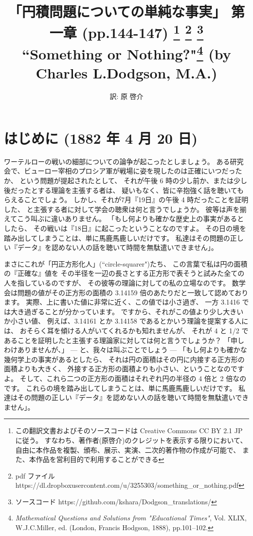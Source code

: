 \documentclass{article}
\title{「円積問題についての単純な事実」 第一章 (pp.144-147)
    \footnote{この翻訳文書およびそのソースコードは
    Creative Commons CC BY 2.1 JP に従う。
    すなわち、著作者(原啓介)のクレジットを表示する限りにおいて、
    自由に本作品を複製、頒布、展示、実演、二次的著作物の作成が可能で、
    また、本作品を営利目的で利用することができる}
    \footnote{pdf ファイル https://dl.dropboxusercontent.com/u/3255303/something\_or\_nothing.pdf}
    \footnote{ソースコード https://github.com/kshara/Dodgson\_translations/}
    \\
    \smallskip
    {\large
        ``Something or Nothing?"\footnote{
          {\it Mathematical Questions and Solutions from "Educational Times"},
            Vol. XLIX,
          W.J.C.Miller, ed. (London, Francis Hodgson, 1888), pp.101--102.}
    (by Charles L.Dodgson, M.A.)
    }
}
\author{訳: 原 啓介}
\begin{document}
\maketitle


\section{はじめに (1882 年 4 月 20 日)}

 ワーテルローの戦いの細部についての論争が起こったとしましょう。
ある研究会で、ビューロー宰相のプロシア軍が戦場に姿を現したのは正確にいつだったか、
という問題が提起されたとして、
それが午後 6 時の少し前か、または少し後だったとする理論を主張する者は、
疑いもなく、皆に辛抱強く話を聴いてもらえることでしょう。
しかし、それが7月『19日』の午後 4 時だったことを証明した、
と主張する者に対して学会の聴衆は何と言うでしょうか。
彼等は声を揃えてこう叫ぶに違いありません。
「もし何よりも確かな歴史上の事実があるとしたら、
その戦いは『18日』に起こったということなのですよ。
その日の境を踏み出してしまうことは、単に馬鹿馬鹿しいだけです。
私達はその問題の正しい『データ』を認めない人の話を聴いて時間を無駄遣いできません」。

まさにこれが「円正方形化人」(``circle-squarer")たち、
この言葉で私は円の面積の『正確な』値を
その半径を一辺の長さとする正方形で表そうと試みた全ての人を指しているのですが、
その彼等の理論に対しての私の立場なのです。
数学会は問題の値がその正方形の面積の 3.14159 倍のあたりだと一致して認めております。
実際、上に書いた値に非常に近く、この値では小さ過ぎ、
一方 3.1416 では大き過ぎることが分かっています。
ですから、それがこの値より少し大きいか小さい値、
例えば、3.14161 とか 3.14158 であるとかいう理論を提案する人には、
おそらく耳を傾ける人がいてくれるかも知れませんが、
それが 4 と 1/2 であることを証明したと主張する理論家に対しては何と言うでしょうか？
「申しわけありませんが、」 — と、我々は叫ぶことでしょう —
「もし何よりも確かな幾何学上の事実があるとしたら、
それは円の面積はその円に内接する正方形の面積よりも大きく、
外接する正方形の面積よりも小さい、ということなのですよ。
そして、これら二つの正方形の面積はそれぞれ円の半径の 4 倍と 2 倍なのです。
これらの境を踏み出してしまうことは、単に馬鹿馬鹿しいだけです。
私達はその問題の正しい『データ』を認めない人の話を聴いて時間を無駄遣いできません」。
\end{document}
